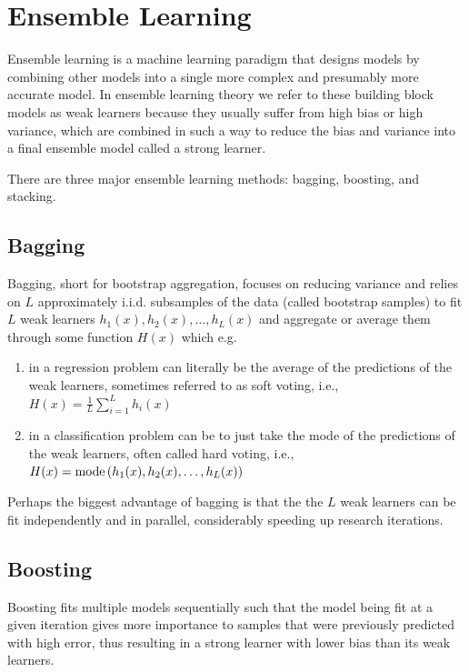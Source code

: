 \section{Ensemble Learning}

Ensemble learning is a machine learning paradigm that designs models by combining other models into a single more complex and presumably more accurate model. In ensemble learning theory we refer to these building block models as weak learners because they usually suffer from high bias or high variance, which are combined in such a way to reduce the bias and variance into a final ensemble model called a strong learner.

There are three major ensemble learning methods: bagging, boosting, and stacking.

\subsection{Bagging}

Bagging, short for bootstrap aggregation, focuses on reducing variance and relies on $L$ approximately i.i.d. subsamples of the data (called bootstrap samples) to fit $L$ weak learners $h_1(x), h_2(x), \ldots, h_L(x)$ and aggregate or average them through some function $H(x)$ which e.g.

\begin{enumerate}
    \item in a regression problem can literally be the average of the predictions of the weak learners, sometimes referred to as soft voting, i.e., $H(x) = \frac{1}{L} \sum_{i=1}^{L} h_i(x)$
    \item in a classification problem can be to just take the mode of the predictions of the weak learners, often called hard voting, i.e., $H(x) = \operatorname*{mode}{(h_1(x), h_2(x), \ldots, h_L(x))}$
\end{enumerate}

Perhaps the biggest advantage of bagging is that the the $L$ weak learners can be fit independently and in parallel, considerably speeding up research iterations.

\subsection{Boosting}

Boosting fits multiple models sequentially such that the model being fit at a given iteration gives more importance to samples that were previously predicted with high error, thus resulting in a strong learner with lower bias than its weak learners.

